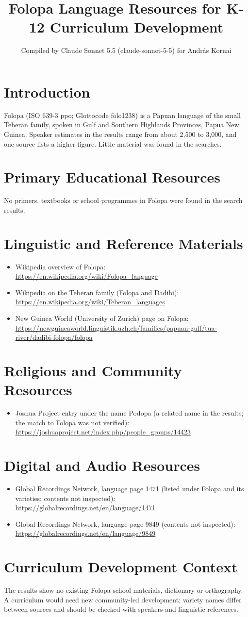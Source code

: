 \documentclass[12pt]{article}
\title{Folopa Language Resources for K-12 Curriculum Development}
\author{Compiled by Claude Sonnet 5.5 (claude-sonnet-5-5) for Andr\'as Kornai}
\date{}
\begin{document}
\maketitle

\section{Introduction}
Folopa (ISO 639-3 ppo; Glottocode folo1238) is a Papuan language of the small Teberan family, spoken in Gulf and Southern Highlands Provinces, Papua New Guinea. Speaker estimates in the results range from about 2,500 to 3,000, and one source lists a higher figure. Little material was found in the searches.

\section{Primary Educational Resources}
No primers, textbooks or school programmes in Folopa were found in the search results.

\section{Linguistic and Reference Materials}
\begin{itemize}
\item Wikipedia overview of Folopa: \url{https://en.wikipedia.org/wiki/Folopa_language}
\item Wikipedia on the Teberan family (Folopa and Dadibi): \url{https://en.wikipedia.org/wiki/Teberan_languages}
\item New Guinea World (University of Zurich) page on Folopa: \url{https://newguineaworld.linguistik.uzh.ch/families/papuan-gulf/tua-river/dadibi-folopa/folopa}
\end{itemize}

\section{Religious and Community Resources}
\begin{itemize}
\item Joshua Project entry under the name Podopa (a related name in the results; the match to Folopa was not verified): \url{https://joshuaproject.net/index.php/people_groups/14423}
\end{itemize}

\section{Digital and Audio Resources}
\begin{itemize}
\item Global Recordings Network, language page 1471 (listed under Folopa and its varieties; contents not inspected): \url{https://globalrecordings.net/en/language/1471}
\item Global Recordings Network, language page 9849 (contents not inspected): \url{https://globalrecordings.net/en/language/9849}
\end{itemize}

\section{Curriculum Development Context}
The results show no existing Folopa school materials, dictionary or orthography. A curriculum would need new community-led development; variety names differ between sources and should be checked with speakers and linguistic references.
\end{document}

